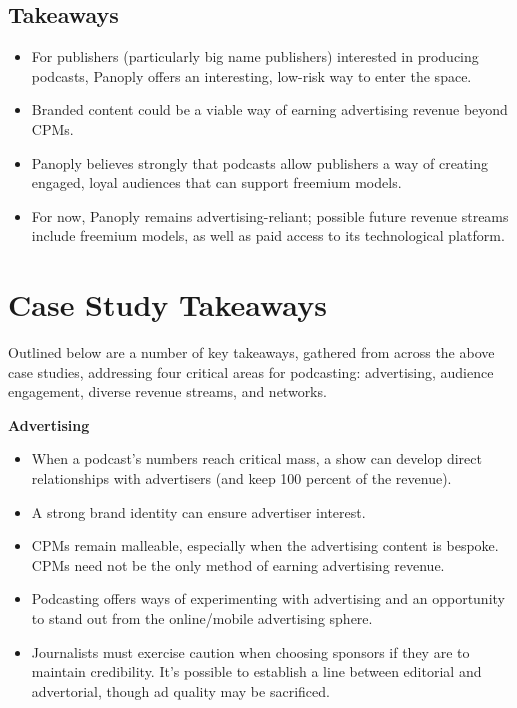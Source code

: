 \documentclass[notoc, symmetric, nobib, nols]{towcenter-guideto-book}
\begin{document}
\subsection{Takeaways}
 
\begin{itemize}
\item For publishers (particularly big name publishers) interested in producing podcasts, Panoply offers an interesting, low-risk way to enter the space.
\item Branded content could be a viable way of earning advertising revenue beyond CPMs.
\item Panoply believes strongly that podcasts allow publishers a way of creating engaged, loyal audiences that can support freemium models. 
\item For now, Panoply remains advertising-reliant; possible future revenue streams include freemium models, as well as paid access to its technological platform.
\end{itemize}

\section{Case Study Takeaways}

Outlined below are a number of key takeaways, gathered from across the above case studies, addressing four critical areas for podcasting: advertising, audience engagement, diverse revenue streams, and networks.

\textbf{Advertising}

\begin{itemize}
\item When a podcast's numbers reach critical mass, a show can develop direct relationships with advertisers (and keep 100 percent of the revenue).
\item A strong brand identity can ensure advertiser interest.
\item CPMs remain malleable, especially when the advertising content is bespoke. CPMs need not be the only method of earning advertising revenue.
\item Podcasting offers ways of experimenting with advertising and an opportunity to stand out from the online/mobile advertising sphere.
\item Journalists must exercise caution when choosing sponsors if they are to maintain credibility. It's possible to establish a line between editorial and advertorial, though ad quality may be sacrificed.
\end{itemize}
\end{document}
